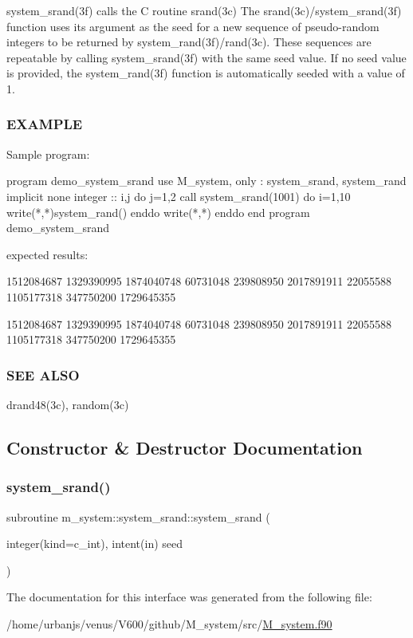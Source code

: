 system\+\_\+srand(3f) calls the C routine srand(3c) The srand(3c)/system\+\_\+srand(3f) function uses its argument as the seed for a new sequence of pseudo-\/random integers to be returned by system\+\_\+rand(3f)/rand(3c). These sequences are repeatable by calling system\+\_\+srand(3f) with the same seed value. If no seed value is provided, the system\+\_\+rand(3f) function is automatically seeded with a value of 1.

\subsubsection*{E\+X\+A\+M\+P\+LE}

\begin{DoxyVerb}Sample program:

   program demo_system_srand
   use M_system, only : system_srand, system_rand
   implicit none
   integer :: i,j
   do j=1,2
      call system_srand(1001)
      do i=1,10
         write(*,*)system_rand()
      enddo
      write(*,*)
   enddo
   end program demo_system_srand
\end{DoxyVerb}
 expected results\+:

1512084687 1329390995 1874040748 60731048 239808950 2017891911 22055588 1105177318 347750200 1729645355

1512084687 1329390995 1874040748 60731048 239808950 2017891911 22055588 1105177318 347750200 1729645355

\subsubsection*{S\+EE A\+L\+SO}

drand48(3c), random(3c) 

\subsection{Constructor \& Destructor Documentation}
\mbox{\label{interfacem__system_1_1system__srand_ade7bd32973cd799f1362cec842bef377}} 
\subsubsection{\texorpdfstring{system\+\_\+srand()}{system\_srand()}}
{\footnotesize\ttfamily subroutine m\+\_\+system\+::system\+\_\+srand\+::system\+\_\+srand (\begin{DoxyParamCaption}\item[{integer(kind=c\+\_\+int), intent(in)}]{seed }\end{DoxyParamCaption})\hspace{0.3cm}{\ttfamily [private]}}



The documentation for this interface was generated from the following file\+:\begin{DoxyCompactItemize}
\item 
/home/urbanjs/venus/\+V600/github/\+M\+\_\+system/src/\mbox{\hyperlink{M__system_8f90}{M\+\_\+system.\+f90}}\end{DoxyCompactItemize}
